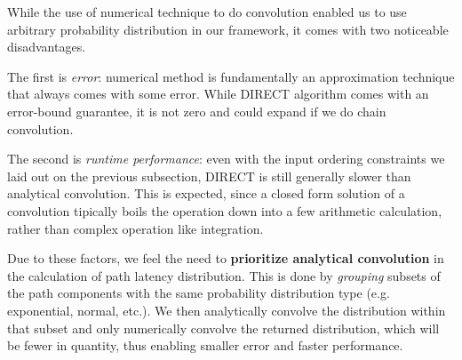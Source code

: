 \documentclass[10pt,sigconf,letterpaper,anonymous,nonacm]{acmart}
\begin{document}
While the use of numerical technique to do convolution enabled us to use arbitrary probability distribution 
in our framework, it comes with two noticeable disadvantages.

The first is \textit{error}: numerical method is fundamentally an approximation technique that always 
comes with some error. 
While DIRECT algorithm comes with an error-bound guarantee, it is not zero and could expand if we do 
chain convolution.

The second is \textit{runtime performance}: even with the input ordering constraints we laid out on the 
previous subsection, DIRECT is still generally slower than analytical convolution.
This is expected, since a closed form solution of a convolution tipically boils the operation down into 
a few arithmetic calculation, rather than complex operation like integration.

Due to these factors, we feel the need to \textbf{prioritize analytical convolution} in the calculation of 
path latency distribution.
This is done by \textit{grouping} subsets of the path components with the same probability distribution 
type (e.g. exponential, normal, etc.). 
We then analytically convolve the distribution within that subset and only numerically convolve the 
returned distribution, which will be fewer in quantity, thus enabling smaller error and faster performance.



\end{document}
